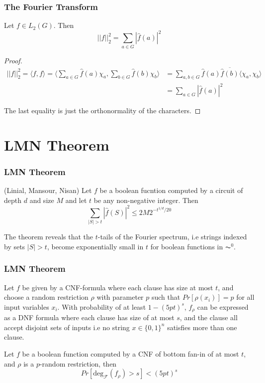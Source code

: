 \documentclass{beamer}
\begin{document}
\begin{frame}
\frametitle{The Fourier Transform}
  \begin{theorem}
    Let $f \in L_2(G)$. Then
    $$ ||f||_2^2 = \sum_{a \in G} |\hat{f}(a)|^2$$
  \end{theorem}
  \begin{proof}
    \begin{align*}
      ||f||^2_2 = \langle f, f \rangle = \langle \sum_{a \in G} \hat{f}(a) \chi_a,  \sum_{b \in G} \hat{f}(b) \chi_b \rangle & = \sum_{a,b \in G} \hat{f}(a)\overline{\hat{f}(b)}\langle \chi_a, \chi_b \rangle \\
      & = \sum_{a \in G} |\hat{f}(a)|^2
    \end{align*}

    The last equality is just the orthonormality of the characters.
  \end{proof}
\end{frame}

\section{LMN Theorem}

\begin{frame}
  \frametitle{LMN Theorem}
  \begin{theorem} (Linial, Mansour, Nisan) \label{lmn}
      Let $f$ be a boolean fucntion computed by a circuit of depth $d$ and size $M$ and let $t$ be any non-negative integer. Then
      \begin{equation}
        \sum_{|S| > t} |\hat{f}(S)|^2 \leq 2M2^{-t^{1/d}/20}
      \end{equation}
  \end{theorem}
  The theorem reveals that the $t$-tails of the Fourier spectrum, i.e strings indexed by sets $|S| > t$, become exponentially small in $t$ for boolean functions in $\AC^0$.
\end{frame}

\begin{frame}
  \frametitle{LMN Theorem}

  \begin{theorem}
    Let $f$ be given by a CNF-formula where each clause has size at most $t$, and choose a random restriction $\rho$ with parameter $p$ such that $Pr[\rho(x_i)] = p$ for all input variables $x_i$. With probability of at least $1 - (5pt)^s$, $f_{\rho}$ can be expressed as a DNF formula where each clause has size of at most $s$, and the clause all accept disjoint sets of inputs i.e no string $x \in \{0,1\}^n$ satisfies more than one clause.
  \end{theorem}

  \begin{corollary} \label{hastaddegree}
  Let $f$ be a boolean function computed by a CNF of bottom fan-in of at most $t$, and $\rho$ is a $p$-random restriction, then
  \begin{equation}
    Pr[\text{deg}_{\mathcal{F}}(f_\rho) > s] < (5pt)^s
  \end{equation}
  \end{corollary}

\end{frame}
\end{document}
